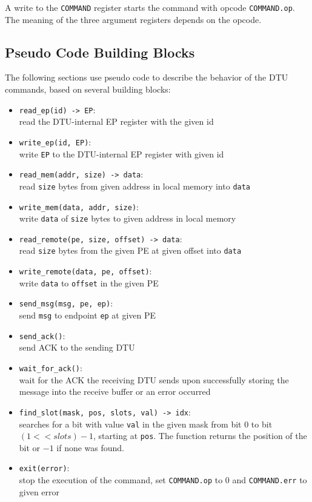 \documentclass[a4paper,11pt,draft]{article}
\begin{document}
\noindent A write to the \texttt{COMMAND} register starts the command with opcode
\texttt{COMMAND.op}. The meaning of the three argument registers depends on the opcode.

\subsection{Pseudo Code Building Blocks}

The following sections use pseudo code to describe the behavior of the DTU commands, based on
several building blocks:

\begin{itemize}
  \item \texttt{read\_ep(id) -> EP}:\\
  read the DTU-internal EP register with the given id
  \item \texttt{write\_ep(id, EP)}:\\
  write \texttt{EP} to the DTU-internal EP register with given id
  \item \texttt{read\_mem(addr, size) -> data}:\\
  read \texttt{size} bytes from given address in local memory into \texttt{data}
  \item \texttt{write\_mem(data, addr, size)}:\\
  write \texttt{data} of \texttt{size} bytes to given address in local memory
  \item \texttt{read\_remote(pe, size, offset) -> data}:\\
  read \texttt{size} bytes from the given PE at given offset into \texttt{data}
  \item \texttt{write\_remote(data, pe, offset)}:\\
  write \texttt{data} to \texttt{offset} in the given PE
  \item \texttt{send\_msg(msg, pe, ep)}:\\
  send \texttt{msg} to endpoint \texttt{ep} at given PE
  \item \texttt{send\_ack()}:\\
  send ACK to the sending DTU
  \item \texttt{wait\_for\_ack()}:\\
  wait for the ACK the receiving DTU sends upon successfully storing the message into the receive
  buffer or an error occurred
  \item \texttt{find\_slot(mask, pos, slots, val) -> idx}:\\
  searches for a bit with value \texttt{val} in the given mask from bit 0 to bit $(1 << slots) - 1$,
  starting at \texttt{pos}. The function returns the position of the bit or $-1$ if none was found.
  \item \texttt{exit(error)}:\\
  stop the execution of the command, set \texttt{COMMAND.op} to 0 and \texttt{COMMAND.err} to given error
\end{itemize}
\end{document}

